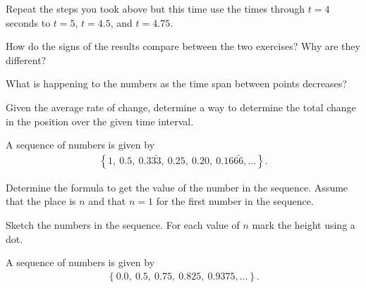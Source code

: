 \begin{problem}
\begin{subproblem}
    \item  Repeat the steps you took above but this time use the times
      through $t=4$ seconds to $t=5$, $t=4.5$, and $t=4.75$.

      \scalebox{0.5}{}
    
      \vfill

    \item How do the signs of the results compare between the two
      exercises? Why are they different?
      \vspace{3em}
    
    \item What is happening to the numbers as the time span between
      points decreases?
      \vspace{3em}

    \item Given the average rate of change, determine a way to
      determine the total change in the position over the given time
      interval.

      \vfill

    \end{subproblem}

    \clearpage

  \item A sequence of numbers is given by
    \begin{eqnarray*}
      \left\{ 1,~0.5,~0.3\bar{33},~0.25,~0.20,~0.16\bar{66}, \ldots \right\}.
    \end{eqnarray*}

    \begin{subproblem}
    \item Determine the formula to get the value of the number in the
      sequence. Assume that the place is $n$ and that $n=1$ for the
      first number in the sequence.  

      \vfill

    \item Sketch the numbers in the sequence. For each value of $n$
      mark the height using a dot.

      \scalebox{0.8}{}

    \end{subproblem}


  \item A sequence of numbers is given by
    \begin{eqnarray*}
      \left\{ 0.0,~0.5,~0.75,~0.825,~0.9375, \ldots \right\}.
    \end{eqnarray*}


\end{problem}
